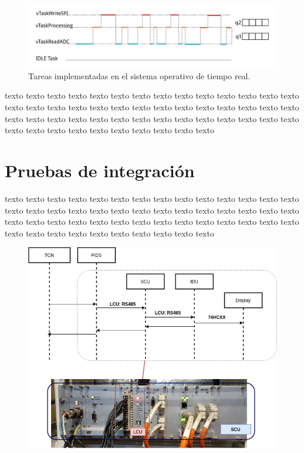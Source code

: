 \documentclass[
11pt, %
]{charter}
\begin{document}
\pagebreak

\begin{figure}[htpb]
\centering 
\includegraphics[width=1\textwidth]{./Pics/RTOS.tasks.png}
\caption{Tareas implementadas en el sistema operativo de tiempo real.}
\label{fig:RTOS tasks}
\end{figure}

texto texto texto texto texto texto texto texto texto texto texto texto texto texto texto texto texto texto texto texto texto texto texto texto texto texto texto texto texto texto texto texto texto texto texto texto texto texto texto texto texto texto texto texto texto texto texto texto texto texto texto texto 


\pagebreak
\section{Pruebas de integración}

texto texto texto texto texto texto texto texto texto texto texto texto texto texto texto texto texto texto texto texto texto texto texto texto texto texto texto texto texto texto texto texto texto texto texto texto texto texto texto texto texto texto texto texto texto texto texto texto texto texto texto texto 


\begin{figure}[htpb]
\centering 
\includegraphics[width=1\textwidth]{./Pics/processDiagram.map.png}
\caption{}
\label{fig:Placa de control map}
\end{figure}
\end{document}
